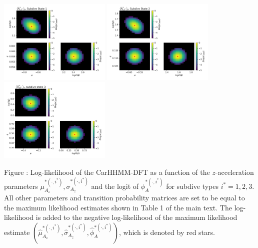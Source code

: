 \documentclass{article}
\begin{document}
        \begin{center}
        \includegraphics[width=2.1in]{../Plots/2019/20190902-182840-CATs_OB_1_0_267_CarHHMM2_fine-theta-likelihood-Az-0.png}
        \includegraphics[width=2.1in]{../Plots/2019/20190902-182840-CATs_OB_1_0_267_CarHHMM2_fine-theta-likelihood-Az-1.png}
        \includegraphics[width=2.1in]{../Plots/2019/20190902-182840-CATs_OB_1_0_267_CarHHMM2_fine-theta-likelihood-Az-2.png}
        \end{center}
        
        \noindent Figure : Log-likelihood of the CarHHMM-DFT as a function of the $z$-acceleration parameters $\mu_{A_z}^{*(\cdot,i^*)}, \sigma_{A_z}^{*(\cdot,i^*)}$ and the logit of $\phi_{A}^{*(\cdot,i^*)}$ for subdive types $i^* = 1,2,3$. All other parameters and transition probability matrices are set to be equal to the maximum likelihood estimates shown in Table 1 of the main text. The log-likelihood is added to the negative log-likelihood of the maximum likelihood estimate $(\hat \mu_{A_z}^{*(\cdot,i^*)}, \hat \sigma_{A_z}^{*(\cdot,i^*)}, \hat \phi_{A}^{*(\cdot,i^*)})$, which is denoted by red stars.
        \addtocounter{fignum}{1}
        
        \newpage
        
\end{document}
